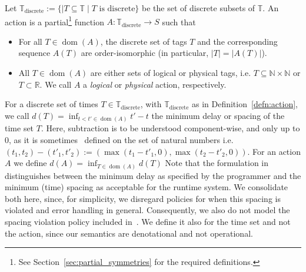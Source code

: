 \begin{defn}
    \label{defn:action}
Let $\mathbb{T}_\text{discrete} := \{ \mid T \subseteq \mathbb{T} \mid T \text{ is discrete}  \}$ be the set of discrete subsets of $\mathbb{T}$.
An action is a partial\footnote{See Section~\ref{sec:partial_symmetries} for the required definitions.} function $A : \mathbb{T}_\text{discrete} \rightarrow S$ such that
\begin{itemize}
    \item For all $T \in \operatorname{dom}(A)$, the discrete set of tags $T$ and the corresponding sequence $A(T)$ are order-isomorphic (in particular, $|T| = |A(T)|$).
    \item All $T \in \operatorname{dom}(A)$ are either sets of logical or physical tags, i.e. $T \subseteq \mathbb{N} \times \mathbb{N}$ or $T  \subset \mathbb{R}$. We call $A$ a \emph{logical} or \emph{physical} action, respectively.
\end{itemize}
\end{defn}

For a discrete set of times $T \in \mathbb{T}_\text{discrete}$, with $\mathbb{T}_\text{discrete}$ as in Definition~\ref{defn:action}, we call $d(T) = \operatorname{inf}_{t < t' \in \operatorname{dom}(A)} t' - t$ the minimum delay or spacing of the time set $T$. 
Here, subtraction is to be understood component-wise, and only up to $0$, as it is sometimes~\cite{runciman1989natural} defined on the set of natural numbers i.e. $(t_1,t_2)-(t'_1,t'_2) := (\max(t_1-t'_1,0),\max(t_2-t'_2,0))$. 
For an action $A$ we define $d(A) = \operatorname{inf}_{T \in \operatorname{dom}(A)} d(T)$
Note that the formulation in~\cite{lohstroh_phdthesis} distinguishes between the minimum delay as specified by the programmer and the minimum (time) spacing as acceptable for the runtime system.
We consolidate both here, since, for simplicity, we disregard policies for when this spacing is violated and error handling in general.
Consequently, we also do not model the spacing violation policy included in~\cite{lohstroh_phdthesis}. 
We define it also for the time set and not the action, since our semantics are denotational and not operational.


